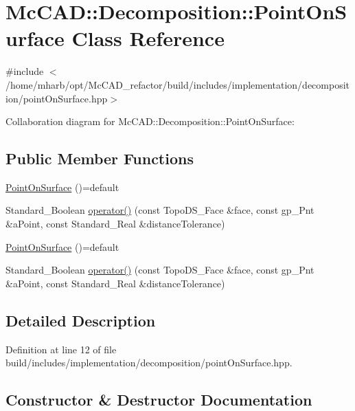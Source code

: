 \hypertarget{classMcCAD_1_1Decomposition_1_1PointOnSurface}{}\section{Mc\+C\+AD\+:\+:Decomposition\+:\+:Point\+On\+Surface Class Reference}
\label{classMcCAD_1_1Decomposition_1_1PointOnSurface}


{\ttfamily \#include $<$/home/mharb/opt/\+Mc\+C\+A\+D\+\_\+refactor/build/includes/implementation/decomposition/point\+On\+Surface.\+hpp$>$}



Collaboration diagram for Mc\+C\+AD\+:\+:Decomposition\+:\+:Point\+On\+Surface\+:
\subsection*{Public Member Functions}
\begin{DoxyCompactItemize}
\item 
\hyperlink{classMcCAD_1_1Decomposition_1_1PointOnSurface_aad85c194a4e5499016a5862482a13875}{Point\+On\+Surface} ()=default
\item 
Standard\+\_\+\+Boolean \hyperlink{classMcCAD_1_1Decomposition_1_1PointOnSurface_a3d8a322860c33299b6c0f3e64b16ee85}{operator()} (const Topo\+D\+S\+\_\+\+Face \&face, const gp\+\_\+\+Pnt \&a\+Point, const Standard\+\_\+\+Real \&distance\+Tolerance)
\item 
\hyperlink{classMcCAD_1_1Decomposition_1_1PointOnSurface_aad85c194a4e5499016a5862482a13875}{Point\+On\+Surface} ()=default
\item 
Standard\+\_\+\+Boolean \hyperlink{classMcCAD_1_1Decomposition_1_1PointOnSurface_a3d8a322860c33299b6c0f3e64b16ee85}{operator()} (const Topo\+D\+S\+\_\+\+Face \&face, const gp\+\_\+\+Pnt \&a\+Point, const Standard\+\_\+\+Real \&distance\+Tolerance)
\end{DoxyCompactItemize}


\subsection{Detailed Description}


Definition at line 12 of file build/includes/implementation/decomposition/point\+On\+Surface.\+hpp.



\subsection{Constructor \& Destructor Documentation}
\mbox{\label{classMcCAD_1_1Decomposition_1_1PointOnSurface_aad85c194a4e5499016a5862482a13875}} 
